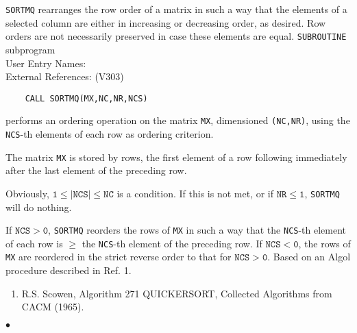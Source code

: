                               
                           
\Submitter{}                                   
{\tt SORTMQ} rearranges the row order of a matrix in such a way that the
elements of a selected column are either in increasing or decreasing
order, as desired. Row orders are not necessarily preserved in case
these elements are equal.
\Structure
{\tt SUBROUTINE} subprogram  \\
User Entry Names: \\
External References:  (V303)
\Usage
\begin{verbatim}
    CALL SORTMQ(MX,NC,NR,NCS)
\end{verbatim}
performs an ordering operation on the matrix {\tt MX},
dimensioned {\tt (NC,NR)}, using the {\tt NCS}-th elements
of each row as ordering criterion.
\par
The matrix {\tt MX} is stored by rows, the first element of a row
following immediately after the last element of the preceding row.
\par
Obviously, $\mathtt{1 \leq |NCS| \leq NC}$ is a condition. If
this is not met, or if $\mathtt{NR \leq 1}$, {\tt SORTMQ} will do
nothing.
\par
If $\mathtt{NCS > 0}$, {\tt SORTMQ} reorders the rows of {\tt MX} in such a
way that the {\tt NCS}-th element of each row is $\geq$ the {\tt NCS}-th
element of the preceding row. If $\mathtt{NCS < 0}$, the rows of {\tt MX}
are reordered in the strict reverse order to that for $\mathtt{NCS > 0}$.
\Source
Based on an Algol procedure described in Ref. 1.
\Refer
\begin{enumerate}
\item R.S. Scowen, Algorithm 271 QUICKERSORT, Collected Algorithms
from CACM (1965).
\end{enumerate}
$\bullet$
